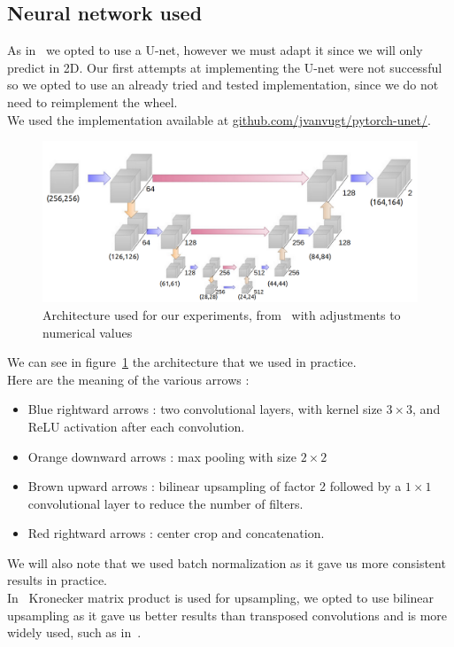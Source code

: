 \subsection{Neural network used}

As in~\cite{funke_large_2019} we opted to use a U-net, however we must adapt
it since we will only predict in 2D. Our first attempts at implementing the
U-net were not successful so we opted to use an already tried and tested
implementation, since we do not need to reimplement the wheel.\\
We used the implementation available at
\hyperlink{https://github.com/jvanvugt/pytorch-unet/}{github.com/jvanvugt/pytorch-unet/}.

\begin{figure}[!htbp]
	\centering
	\includegraphics[width=1\linewidth]{./images/archi_unet.png}
	\caption{Architecture used for our experiments,
	from~\cite{funke_large_2019} with adjustments to numerical values}%
	\label{fig:archi_unet}
\end{figure}

We can see in figure~\ref{fig:archi_unet} the architecture that we used in
practice.\\
Here are the meaning of the various arrows :
\begin{itemize}
	\item Blue rightward arrows : two convolutional layers, with kernel size
		$3\times3$, and ReLU activation after each convolution.
	\item Orange downward arrows : max pooling with size $2\times2$
	\item Brown upward arrows : bilinear upsampling of factor 2 followed by a
		$1\times1$ convolutional layer to reduce the number of filters.
	\item Red rightward arrows : center crop and concatenation.
\end{itemize}
We will also note that we used batch normalization as it gave us more
consistent results in practice.\\
In~\cite{funke_large_2019} Kronecker matrix product is used for upsampling, we
opted to use bilinear upsampling as it gave us better results than transposed
convolutions and is more widely used, such as in~\cite{ronneberger_2015}.\\

